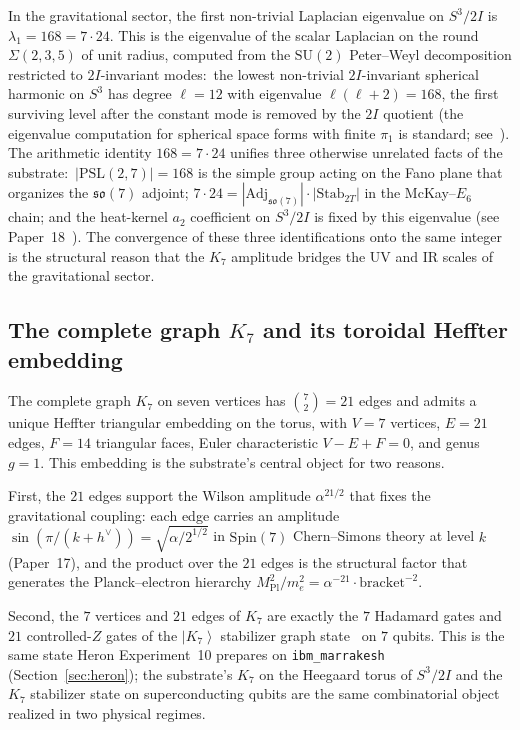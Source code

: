 \documentclass[11pt]{article}
\newcommand{\so}{\mathfrak{so}}
\newcommand{\Spin}{\mathrm{Spin}}
\newcommand{\Adj}{\mathrm{Adj}}
\newcommand{\ket}[1]{\left|#1\right\rangle}
\newcommand{\hv}{h^{\vee}}
\newcommand{\PSL}{\mathrm{PSL}}
\newcommand{\SU}{\mathrm{SU}}
\begin{document}
In the gravitational sector, the first non-trivial Laplacian
eigenvalue on $S^3/2I$ is $\lambda_1 = 168 = 7\cdot 24$.  This
is the eigenvalue of the scalar Laplacian on the round
$\Sigma(2,3,5)$ of unit radius, computed from the $\SU(2)$
Peter--Weyl decomposition restricted to $2I$-invariant modes:\
the lowest non-trivial $2I$-invariant spherical harmonic on
$S^3$ has degree $\ell = 12$ with eigenvalue
$\ell(\ell+2) = 168$, the first surviving level after the
constant mode is removed by the $2I$ quotient (the
eigenvalue computation for spherical space forms with finite
$\pi_1$ is standard; see~\cite{wolf1967}).  The arithmetic
identity $168 = 7\cdot 24$ unifies three otherwise unrelated
facts of the substrate:\ $|\PSL(2,7)| = 168$ is the simple
group acting on the Fano plane that organizes the $\so(7)$
adjoint; $7\cdot 24 = |\Adj_{\so(7)}| \cdot
|\mathrm{Stab}_{2T}|$ in the McKay--$E_6$ chain; and the
heat-kernel $a_2$ coefficient on $S^3/2I$ is fixed by this
eigenvalue (see Paper~18~\cite{paper18}).  The convergence of
these three identifications onto the same integer is the
structural reason that the $K_7$ amplitude bridges the UV and
IR scales of the gravitational sector.

\subsection{The complete graph $K_7$ and its toroidal Heffter
embedding}

The complete graph $K_7$ on seven vertices has $\binom{7}{2} = 21$
edges and admits a unique Heffter triangular embedding on the
torus, with $V = 7$ vertices, $E = 21$ edges, $F = 14$ triangular
faces, Euler characteristic $V - E + F = 0$, and genus $g = 1$.
This embedding is the substrate's central object for two reasons.

First, the $21$ edges support the Wilson amplitude
$\alpha^{21/2}$ that fixes the gravitational coupling: each edge
carries an amplitude $\sin(\pi/(k+\hv)) = \sqrt{\alpha/2^{1/2}}$
in $\Spin(7)$ Chern--Simons theory at level $k$ (Paper~17), and
the product over the $21$ edges is the structural factor that
generates the Planck--electron hierarchy
$M_{\mathrm{Pl}}^2 / m_e^2 = \alpha^{-21}\cdot \mathrm{bracket}^{-2}$.

Second, the $7$ vertices and $21$ edges of $K_7$ are exactly the
$7$ Hadamard gates and $21$ controlled-$Z$ gates of the
$\ket{K_7}$ stabilizer graph state~\cite{hein2004} on $7$ qubits.
This is the same state Heron Experiment~10 prepares on
\texttt{ibm\_marrakesh} (Section~\ref{sec:heron}); the substrate's
$K_7$ on the Heegaard torus of $S^3/2I$ and the $K_7$ stabilizer
state on superconducting qubits are the same combinatorial object
realized in two physical regimes.
\end{document}
